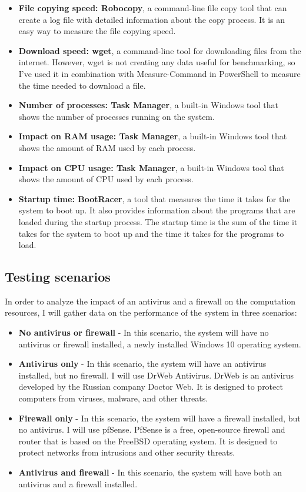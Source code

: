 \documentclass[runningheads,a4paper,english]{llncs}[2022/01/12]
\begin{document}
\begin{itemize}
\item \textbf{File copying speed: Robocopy}\cite{Robocopy},
a command-line file copy tool that can create a log file with detailed
information about the copy process. It is an easy way to measure the file
copying speed. 
\item \textbf{Download speed: wget}\cite{Wget}, a command-line tool for
downloading files from the internet. However, wget is not creating any data
useful for benchmarking, so I've used it in combination with 
Measure-Command\cite{MeasureCommand} in PowerShell to measure the time needed
to download a file.
\item \textbf{Number of processes: Task Manager}, a built-in Windows tool that
shows the number of processes running on the system.
\item \textbf{Impact on RAM usage: Task Manager}, a built-in Windows tool that
shows the amount of RAM used by each process.
\item \textbf{Impact on CPU usage: Task Manager}, a built-in Windows tool that
shows the amount of CPU used by each process.
\item \textbf{Startup time: BootRacer}\cite{BootRacer}, a tool that
measures the time it takes for the system to boot up. It also provides
information about the programs that are loaded during the startup process.
The startup time is the sum of the time it takes for the system to boot up and
the time it takes for the programs to load.
\end{itemize}

\subsection{Testing scenarios}
\label{sec:scenarios}

\par In order to analyze the impact of an antivirus and a firewall on the
computation resources, I will gather data on the performance of the system in
three scenarios:

\begin{itemize}
\item \textbf{No antivirus or firewall} - In this scenario, the system will
have no antivirus or firewall installed, a newly installed Windows 10 operating
system.
\item \textbf{Antivirus only} - In this scenario, the system will have an
antivirus installed, but no firewall. I will use DrWeb Antivirus\cite{DrWeb}.
DrWeb is an antivirus developed by the Russian company Doctor Web. It is
designed to protect computers from viruses, malware, and other threats.
\item \textbf{Firewall only} - In this scenario, the system will have a
firewall installed, but no antivirus. I will use pfSense\cite{pfSense}. PfSense
is a free, open-source firewall and router that is based on the FreeBSD
operating system. It is designed to protect networks from intrusions and other
security threats.
\item \textbf{Antivirus and firewall} - In this scenario, the system will have
both an antivirus and a firewall installed.
\end{itemize}
\end{document}
